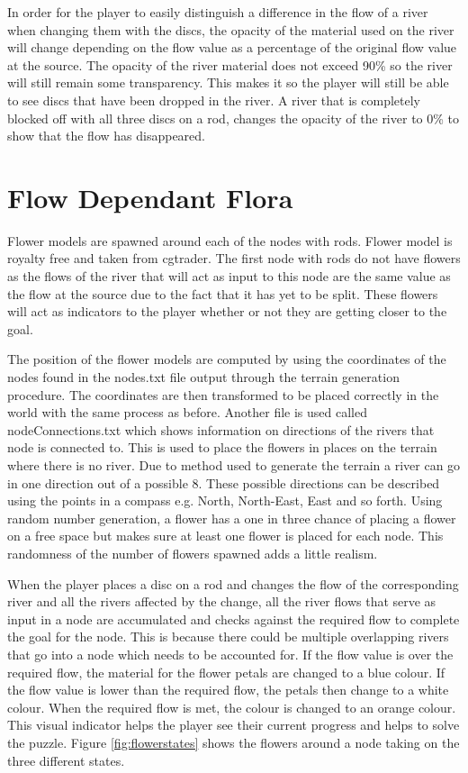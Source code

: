 \newline
\par
In order for the player to easily distinguish a difference in the flow of a river when changing them with the discs, the opacity of the material used on the river will change depending on the flow value as a percentage of the original flow value at the source. The opacity of the river material does not exceed 90\% so the river will still remain some transparency. This makes it so the player will still be able to see discs that have been dropped in the river. A river that is completely blocked off with all three discs on a rod, changes the opacity of the river to 0\% to show that the flow has disappeared.

\section{Flow Dependant Flora}
Flower models are spawned around each of the nodes with rods. Flower model is royalty free and taken from cgtrader\cite{flowermodel}. The first node with rods do not have flowers as the flows of the river that will act as input to this node are the same value as the flow at the source due to the fact that it has yet to be split. These flowers will act as indicators to the player whether or not they are getting closer to the goal.
\newline
\par
The position of the flower models are computed by using the coordinates of the nodes found in the nodes.txt file output through the terrain generation procedure. The coordinates are then transformed to be placed correctly in the world with the same process as before. Another file is used called nodeConnections.txt which shows information on directions of the rivers that node is connected to. This is used to place the flowers in places on the terrain where there is no river. Due to method used to generate the terrain a river can go in one direction out of a possible 8. These possible directions can be described using the points in a compass e.g. North, North-East, East and so forth. Using random number generation, a flower has a one in three chance of placing a flower on a free space but makes sure at least one flower is placed for each node. This randomness of the number of flowers spawned adds a little realism.
\newline
\par
When the player places a disc on a rod and changes the flow of the corresponding river and all the rivers affected by the change, all the river flows that serve as input in a node are accumulated and checks against the required flow to complete the goal for the node. This is because there could be multiple overlapping rivers that go into a node which needs to be accounted for. If the flow value is over the required flow, the material for the flower petals are changed to a blue colour. If the flow value is lower than the required flow, the petals then change to a white colour. When the required flow is met, the colour is changed to an orange colour. This visual indicator helps the player see their current progress and helps to solve the puzzle. Figure \ref{fig:flowerstates} shows the flowers around a node taking on the three different states.

